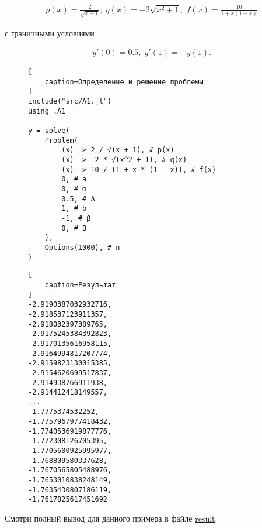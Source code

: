 \documentclass{article}
\newcommand{\sd}[0]{\iter\hypertarget{skip:\thesecounter.\theeqcounter}{\vspace{-10pt}}}
\newcommand{\hep}[1]{\vspace{#1pt}\hypertarget{eq:\thesecounter.\theeqcounter}{}\vspace{-#1pt}}
\newcommand{\hs}[0]{\sd\hep{18}}
\numberwithin{equation}{section}
\newcounter{secounter}[section]
\newcounter{eqcounter}
\newcommand{\iter}[0]{\stepcounter{eqcounter}}
\begin{document}
\hs
\begin{gather}
    p(x) = \frac{2}{\sqrt{x+1}}, \;
    q(x) = -2 \sqrt{x^2 + 1}, \;
    f(x) = \frac{10}{1 + x (1-x)}
\end{gather}

с граничными условиями

\hs
\begin{gather}
y'(0) = 0.5, \; y'(1) = -y(1).
\end{gather}

\begin{figure}[H]
\begin{lstlisting}[
    caption=Определение и решение проблемы
]
include("src/A1.jl")
using .A1

y = solve(
    Problem(
        (x) -> 2 / √(x + 1), # p(x)
        (x) -> -2 * √(x^2 + 1), # q(x)
        (x) -> 10 / (1 + x * (1 - x)), # f(x)
        0, # a
        0, # α
        0.5, # A
        1, # b
        -1, # β
        0, # B
    ),
    Options(1000), # n
)
\end{lstlisting}
\end{figure}

\begin{figure}[H]
\begin{lstlisting}[
    caption=Результат
]
-2.9190387032932716,
-2.918537123911357,
-2.918032397389765,
-2.9175245384392823,
-2.9170135616958115,
-2.9164994817207774,
-2.9159823130015385,
-2.9154620699517837,
-2.914938766911938,
-2.914412418149557,
...
-1.7775374532252,
-1.7757967977418432,
-1.7740536919877776,
-1.772308126705395,
-1.7705600925995977,
-1.768809580337628,
-1.7670565805488976,
-1.7653010838248149,
-1.7635430807186119,
-1.7617825617451692
\end{lstlisting}
\end{figure}

Смотри полный вывод для данного примера в файле
\href{https://raw.githubusercontent.com/paveloom-p/P12/master/A1/result}{result}.
\end{document}
